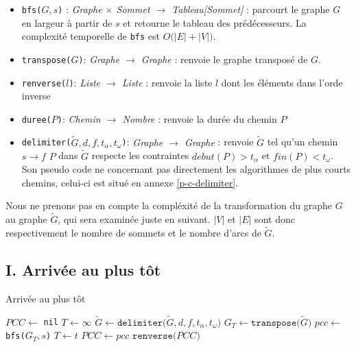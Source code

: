 \documentclass{article}
\begin{document}
\begin{itemize}[label=-]
    \item \texttt{bfs($G, s$)} : \textit{Graphe $\times$ Sommet $\rightarrow$ Tableau[Sommet]} :
    parcourt le graphe $G$ en largeur à partir de $s$ et retourne le tableau des prédécesseurs.
    La complexité temporelle de \texttt{bfs} est $O\big(|E|+|V|)$.
    \item \texttt{transpose($G$)}: \textit{Graphe $\rightarrow$ Graphe} :
    renvoie le graphe transposé de $G$.
    \item \texttt{renverse($l$)}: \textit{Liste $\rightarrow$ Liste} : renvoie la
    liste $l$ dont les éléments dans l'orde inverse
    \item \texttt{duree($P$)}: \textit{Chemin $\rightarrow$ Nombre} : renvoie la
    durée du chemin $P$
    \item \texttt{delimiter($\tilde{G},d, f, t_\alpha, t_\omega$)}:
    \textit{Graphe $\rightarrow$ Graphe} : renvoie $\tilde{G}$ tel qu'un chemin
    $s \rightarrow f$ $P$ dans $\tilde{G}$ respecte les contraintes $debut(P) >
    t_\alpha$ et $fin(P)<t_\omega$. Son pseudo code ne concernant pas
    directement les algorithmes de plus courts chemins, celui-ci est situé en
    annexe \ref{p-c-delimiter}.
\end{itemize}

Nous ne prenons pas en compte la compléxité de la transformation du graphe $G$
au graphe $\tilde{G}$, qui sera examinée juste en suivant. $|V|$ et $|E|$ sont donc
respectivement le nombre de sommets et le nombre d'arcs de $\tilde{G}$.

\subsection*{I. Arrivée au plus tôt}
\begin{algorithm}[h]
    \caption{Arrivée au plus tôt}
    \begin{algorithmic}[1]
    \State $PCC \leftarrow $ \texttt{nil} 
    \State $T \leftarrow \infty$ 
    \State $\tilde{G} \leftarrow \texttt{delimiter($\tilde{G}, d, f, t_\alpha, t_\omega$)}$
    \State $G_T \leftarrow \texttt{transpose($\tilde{G}$)}$
        \State $pcc \leftarrow$ \texttt{bfs($G_T, s$)}
            \State $T \leftarrow t$
            \State $PCC \leftarrow pcc$
        \EndIf
    \EndFor
    \State \Return $\texttt{renverse($PCC$)}$
    \EndProcedure
    \end{algorithmic}
\end{algorithm}
\end{document}
